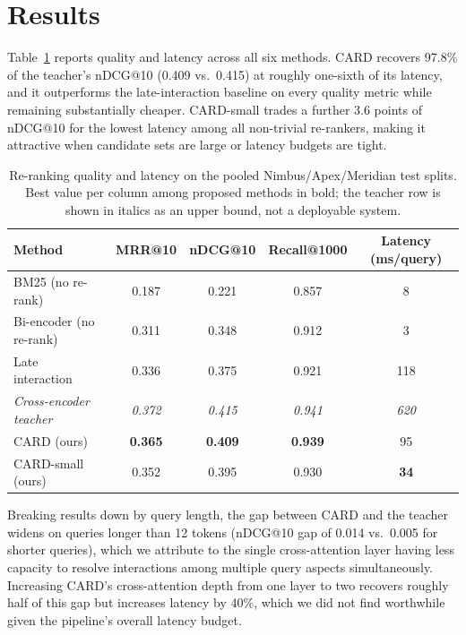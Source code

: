 \section{Results}
\label{sec:results}

Table~\ref{tab:results} reports quality and latency across all six methods.
CARD recovers 97.8\% of the teacher's nDCG@10 (0.409 vs.\ 0.415) at roughly
one-sixth of its latency, and it outperforms the late-interaction baseline
on every quality metric while remaining substantially cheaper. CARD-small
trades a further 3.6 points of nDCG@10 for the lowest latency among all
non-trivial re-rankers, making it attractive when candidate sets are large
or latency budgets are tight.

\begin{table}[t]
\centering
\small
\caption{Re-ranking quality and latency on the pooled Nimbus/Apex/Meridian
test splits. Best value per column among proposed methods in bold;
the teacher row is shown in italics as an upper bound, not a deployable
system.}
\label{tab:results}
\begin{tabular}{lcccc}
\toprule
Method & MRR@10 & nDCG@10 & Recall@1000 & Latency (ms/query) \\
\midrule
BM25 (no re-rank)          & 0.187 & 0.221 & 0.857 & 8 \\
Bi-encoder (no re-rank)    & 0.311 & 0.348 & 0.912 & 3 \\
Late interaction~\cite{solheim2020late} & 0.336 & 0.375 & 0.921 & 118 \\
\textit{Cross-encoder teacher~\cite{marchetti2020monobert}} & \textit{0.372} & \textit{0.415} & \textit{0.941} & \textit{620} \\
\rowcolor{sigirlight}
CARD (ours)                & \textbf{0.365} & \textbf{0.409} & \textbf{0.939} & 95 \\
CARD-small (ours)          & 0.352 & 0.395 & 0.930 & \textbf{34} \\
\bottomrule
\end{tabular}
\end{table}

Breaking results down by query length, the gap between CARD and the teacher
widens on queries longer than 12 tokens (nDCG@10 gap of 0.014 vs.\ 0.005 for
shorter queries), which we attribute to the single cross-attention layer
having less capacity to resolve interactions among multiple query aspects
simultaneously. Increasing CARD's cross-attention depth from one layer to two
recovers roughly half of this gap but increases latency by 40\%, which we
did not find worthwhile given the pipeline's overall latency budget.
